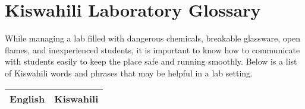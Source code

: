 \chapter{Kiswahili Laboratory Glossary}

While managing a lab filled with dangerous chemicals, breakable glassware, open flames, and inexperienced students, it is important to know how to communicate with students easily to keep the place safe and running smoothly. Below is a list of Kiswahili words and phrases that may be helpful in a lab setting.

\begin{center}
\begin{longtable}{|p{7cm}|p{7cm}|}\hline

\multicolumn{1}{|c|}{\textbf{English}}	&	\multicolumn{1}{c|}{\textbf{Kiswahili}}	\\	\hline


\end{longtable}
\end{center}
